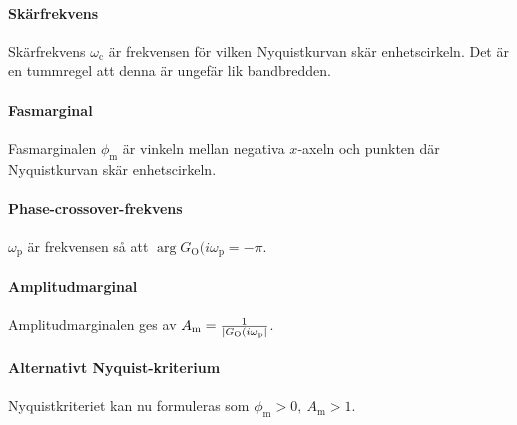 \paragraph{Skärfrekvens}
Skärfrekvens $\omega_{\text{c}}$ är frekvensen för vilken Nyquistkurvan skär enhetscirkeln. Det är en tummregel att denna är ungefär lik bandbredden.

\paragraph{Fasmarginal}
Fasmarginalen $\phi_{\text{m}}$ är vinkeln mellan negativa $x$-axeln och punkten där Nyquistkurvan skär enhetscirkeln.

\paragraph{Phase-crossover-frekvens}
$\omega_{\text{p}}$ är frekvensen så att $\arg{G_{\text{O}}(i\omega_{\text{p}}} = -\pi$.

\paragraph{Amplitudmarginal}
Amplitudmarginalen ges av $A_{\text{m}} = \frac{1}{\abs{G_{\text{O}}(i\omega_{\text{p}}}}$.

\paragraph{Alternativt Nyquist-kriterium}
Nyquistkriteriet kan nu formuleras som $\phi_{\text{m}} > 0,\ A_{\text{m}} > 1$.